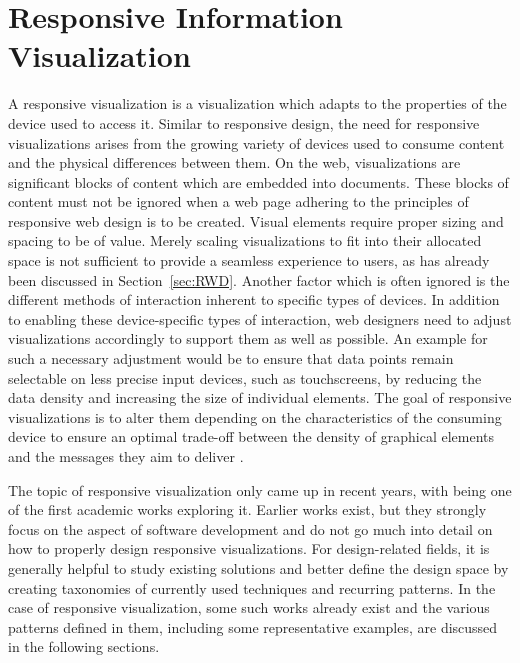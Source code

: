 \chapter{Responsive Information Visualization}

A responsive visualization is a visualization which adapts to the properties of the device used to access it.
Similar to responsive design, the need for responsive visualizations arises from the growing variety of devices used to consume content and the physical differences between them.
On the web, visualizations are significant blocks of content which are embedded into documents.
These blocks of content must not be ignored when a web page adhering to the principles of responsive web design is to be created.
Visual elements require proper sizing and spacing to be of value.
Merely scaling visualizations to fit into their allocated space is not sufficient to provide a seamless experience to users, as has already been discussed in Section~\ref{sec:RWD}.
Another factor which is often ignored is the different methods of interaction inherent to specific types of devices.
In addition to enabling these device-specific types of interaction, web designers need to adjust visualizations accordingly to support them as well as possible.
An example for such a necessary adjustment would be to ensure that data points remain selectable on less precise input devices, such as touchscreens, by reducing the data density and increasing the size of individual elements.
The goal of responsive visualizations is to alter them depending on the characteristics of the consuming device to ensure an optimal trade-off between the density of graphical elements and the messages they aim to deliver \parencite{DesignPatternsTradeOffsRespVis}. 

The topic of responsive visualization only came up in recent years, with \textcite{RespVis} being one of the first academic works exploring it.
Earlier works \parencite{BuildingRespDataVisForTheWeb,LearningRespDataVis} exist, but they strongly focus on the aspect of software development and do not go much into detail on how to properly design responsive visualizations.
 For design-related fields, it is generally helpful to study existing solutions and better define the design space by creating taxonomies of currently used techniques and recurring patterns.
In the case of responsive visualization, some such works already exist \parencite{TechniquesForFlexibleRespVisDesign,DesignPatternsTradeOffsRespVis,RespVisSurvey} and the various patterns defined in them, including some representative examples, are discussed in the following sections.

